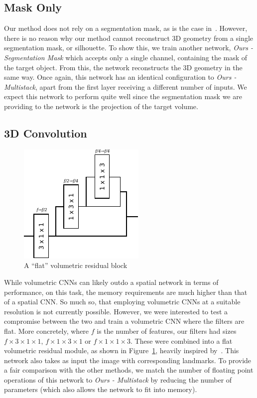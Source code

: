 \subsection{Mask Only}

Our method does not rely on a segmentation mask, as is the case
in~\cite{sigal2008combined}. However, there is no reason why our
method cannot reconstruct 3D geometry from a single segmentation mask,
or silhouette. To show this, we train another network, \textit{Ours -
  Segmentation Mask} which accepts only a single channel, containing
the mask of the target object. From this, the network reconstructs the
3D geometry in the same way. Once again, this network has an identical
configuration to \textit{Ours - Multistack}, apart from the first
layer receiving a different number of inputs. We expect this network
to perform quite well since the segmentation mask we are providing to
the network is the projection of the target volume.

\subsection{3D Convolution}

\begin{figure}
  \centering
  \includegraphics[width=0.3\linewidth]{img/volumetric_residual.pdf}
  \caption{A ``flat'' volumetric residual block}
  \label{fig:flat_vol_residual}
\end{figure}

While volumetric CNNs can likely outdo a spatial network in terms of
performance, on this task, the memory requirements are much higher
than that of a spatial CNN. So much so, that employing volumetric CNNs
at a suitable resolution is not currently possible. However, we were
interested to test a compromise between the two and train a volumetric
CNN where the filters are flat. More concretely, where $f$ is the
number of features, our filters had sizes $f\times 3\times 1\times 1$,
$f\times 1\times 3\times 1$ or $f\times 1\times 1\times 3$. These were
combined into a flat volumetric residual module, as shown in
Figure~\ref{fig:flat_vol_residual}, heavily inspired
by~\cite{qiu2017learning}. This network also takes as input the image
with corresponding landmarks. To provide a fair comparison with the
other methods, we match the number of floating point operations of
this network to \textit{Ours - Multistack} by reducing the number of
parameters (which also allows the network to fit into memory).



